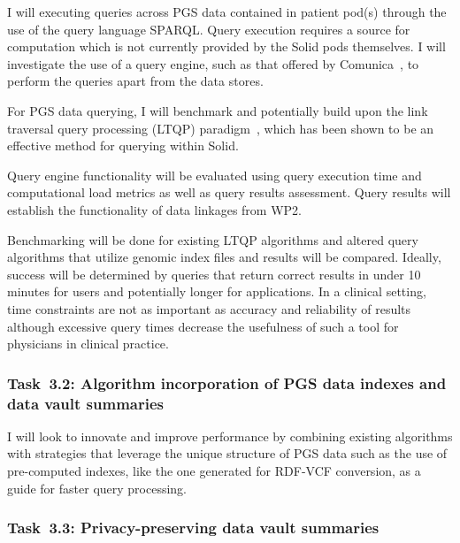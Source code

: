 \documentclass[a4paper,11pt]{article}
\begin{document}
\begin{refsection}
I will executing queries across PGS data contained in patient pod(s) through the use of the query language SPARQL.
Query execution requires a source for computation which is not currently provided by the Solid pods themselves.
I will investigate the use of a query engine, such as that offered by Comunica~\cite{comunica}, to perform the queries apart from the data stores.

For PGS data querying, I will benchmark and potentially build upon the link traversal query processing (LTQP) paradigm~\cite{taelman_evaluation_2023}, which has been shown to be an effective method for querying within Solid.  


Query engine functionality will be evaluated using query execution time and computational load metrics as well as query results assessment. 
Query results will establish the functionality of data linkages from WP2.

Benchmarking will be done for existing LTQP algorithms and altered query algorithms that utilize genomic index files and results will be compared.
Ideally, success will be determined by queries that return correct results in under 10 minutes for users and potentially longer for applications.
In a clinical setting, time constraints are not as important as accuracy and reliability of results although excessive query times decrease the usefulness of such a tool for physicians in clinical practice.



\newcommand\WPcb{Algorithm incorporation of PGS data indexes and data vault summaries}
\subsubsection{Task~3.2: \WPcb}

I will look to innovate and improve performance by combining existing algorithms with strategies that leverage the unique structure of PGS data such as the use of pre-computed indexes, like the one generated for RDF-VCF conversion, as a guide for faster query processing.


\newcommand\WPcc{Privacy-preserving data vault summaries}
\subsubsection{Task~3.3: \WPcc}


\end{refsection}
\end{document}
